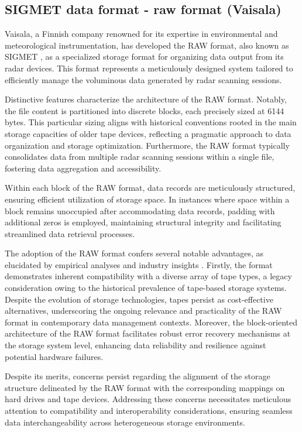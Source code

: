 \subsection{SIGMET data format - raw format (Vaisala)}
\label{sigmet}
Vaisala, a Finnish company renowned for its expertise in environmental and
meteorological instrumentation, has developed the RAW format, also known as
SIGMET \cite{lrose_RadxConvert}, as a specialized storage format for organizing
data output from its radar devices. This format represents a meticulously
designed system tailored to efficiently manage the voluminous data generated by
radar scanning sessions.

Distinctive features characterize the architecture of the RAW format. Notably,
the file content is partitioned into discrete blocks, each precisely sized at
6144 bytes. This particular sizing aligns with historical conventions rooted in
the main storage capacities of older tape devices, reflecting a pragmatic
approach to data organization and storage optimization. Furthermore, the RAW
format typically consolidates data from multiple radar scanning sessions within
a single file, fostering data aggregation and accessibility.

Within each block of the RAW format, data records are meticulously structured,
ensuring efficient utilization of storage space. In instances where space within
a block remains unoccupied after accommodating data records, padding with
additional zeros is employed, maintaining structural integrity and facilitating
streamlined data retrieval processes.

The adoption of the RAW format confers several notable advantages, as elucidated
by empirical analyses and industry insights \cite{raw_product_format_vaisala}. Firstly, the format
demonstrates inherent compatibility with a diverse array of tape types, a legacy
consideration owing to the historical prevalence of tape-based storage systems.
Despite the evolution of storage technologies, tapes persist as cost-effective
alternatives, underscoring the ongoing relevance and practicality of the RAW
format in contemporary data management contexts. Moreover, the block-oriented
architecture of the RAW format facilitates robust error recovery mechanisms at
the storage system level, enhancing data reliability and resilience against
potential hardware failures.

Despite its merits, concerns persist regarding the alignment of the storage
structure delineated by the RAW format with the corresponding mappings on hard
drives and tape devices. Addressing these concerns necessitates meticulous
attention to compatibility and interoperability considerations, ensuring
seamless data interchangeability across heterogeneous storage environments.


